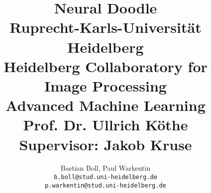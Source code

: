
\title{%
  {\LARGE \textbf{Neural Doodle}} \\[0.5cm]
  {\large Ruprecht-Karls-Universität Heidelberg} \\
  {\large Heidelberg Collaboratory for Image Processing} \\[0.5cm]
  {\large Advanced Machine Learning} \\[-0.2cm]
  {\large Prof. Dr. Ullrich Köthe} \\
  {\large Supervisor: Jakob Kruse}
}

\author{%
  Bastian Boll, Paul Warkentin \\
  {\tt\small b.boll@stud.uni-heidelberg.de} \\
  {\tt\small p.warkentin@stud.uni-heidelberg.de}
}

\maketitle
